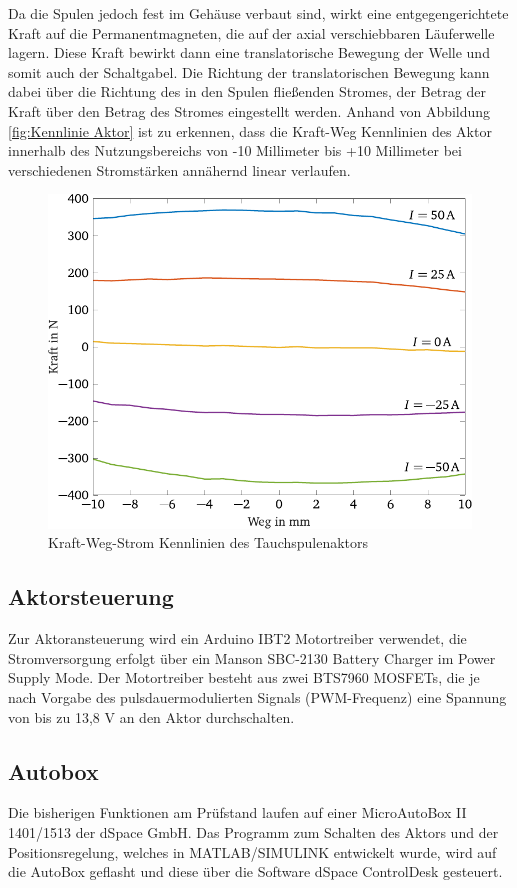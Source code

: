 Da die Spulen jedoch fest im Gehäuse verbaut sind, wirkt eine entgegengerichtete Kraft auf die Permanentmagneten, die auf der axial verschiebbaren Läuferwelle lagern. Diese Kraft bewirkt dann eine translatorische Bewegung der Welle und somit auch der Schaltgabel. Die Richtung der translatorischen Bewegung kann dabei über die Richtung des in den Spulen fließenden Stromes, der Betrag der Kraft über den Betrag des Stromes eingestellt werden.
Anhand von Abbildung \autoref{fig:Kennlinie Aktor} ist zu erkennen, dass die Kraft-Weg Kennlinien des Aktor innerhalb des Nutzungsbereichs von -10 Millimeter bis +10 Millimeter bei verschiedenen Stromstärken annähernd linear verlaufen. \\

\begin{figure}[h]
	\centering
		\includegraphics[width=0.6\columnwidth]{Bilder/KennlinieAktor.pdf}
	\caption{Kraft-Weg-Strom Kennlinien des Tauchspulenaktors \cite[S.12]{adp}}
	\label{fig:Kennlinie Aktor}
\end{figure} \noindent

\subsection{Aktorsteuerung}

Zur Aktoransteuerung wird ein Arduino IBT2 Motortreiber verwendet, die Stromversorgung erfolgt über ein Manson SBC-2130 Battery Charger im Power Supply Mode. Der Motortreiber besteht aus zwei BTS7960 MOSFETs, die je nach Vorgabe des pulsdauermodulierten Signals (PWM-Frequenz) eine Spannung von bis zu 13,8 V an den Aktor durchschalten. 

\subsection{Autobox}

Die bisherigen Funktionen am Prüfstand laufen auf einer MicroAutoBox II 1401/1513 der dSpace GmbH. Das Programm zum Schalten des Aktors und der Positionsregelung, welches in MATLAB/SIMULINK entwickelt wurde, wird auf die AutoBox geflasht und diese über die Software dSpace ControlDesk gesteuert.

